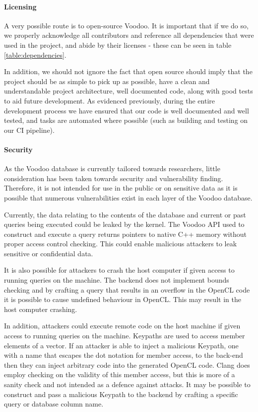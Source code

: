 \paragraph{Licensing}

A very possible route is to open-source Voodoo. It is important that if we do so, we properly acknowledge all contributors and reference all dependencies that were used in the project, and abide by their licenses - these can be seen in table \ref{table:dependencies}.

In addition, we should not ignore the fact that open source should imply that the project should be as simple to pick up as possible, have a clean and understandable project architecture, well documented code, along with good tests to aid future development. As evidenced previously, during the entire development process we have ensured that our code is well documented and well tested, and tasks are automated where possible (such as building and testing on our CI pipeline).

\paragraph{Security}

As the Voodoo database is currently tailored towards researchers, little  consideration has been taken towards security and vulnerability finding. Therefore, it is not intended for use in the public or on sensitive data as it is possible that numerous vulnerabilities exist in each layer of the Voodoo database.

Currently, the data relating to the contents of the database and current or past queries being executed could be leaked by the kernel. The Voodoo API used to construct and execute a query returns pointers to native C++ memory without proper access control checking. This could enable malicious attackers to leak sensitive or confidential data.

It is also possible for attackers to crash the host computer if given access to running queries on the machine. The backend does not implement bounds checking and by crafting a query that results in an overflow in the OpenCL code it is possible to cause undefined behaviour in OpenCL. This may result in the host computer crashing.

In addition, attackers could execute remote code on the host machine if given access to running queries on the machine. Keypaths are used to access member elements of a vector. If an attacker is able to inject a malicious Keypath, one with a name that escapes the dot notation for member access, to the back-end then they can inject arbitrary code into the generated OpenCL code. Clang does employ checking on the validity of this member access, but this is more of a sanity check and not intended as a defence against attacks. It may be possible to construct and pass a malicious Keypath to the backend by crafting a specific query or database column name.

